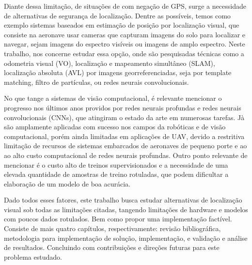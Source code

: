 Diante dessa limitação, de situações de com negação de GPS, surge a necessidade de alternativas de segurança de localização. Dentre as possíveis, temos como exemplo sistemas baseados em estimação de posição por localização visual, que consiste na aeronave usar cameras que capturam imagens do solo para localizar e navegar, sejam imagens do espectro visíveis ou imagens de amplo espectro. Neste trabalho, nos concerne estudar essa opção, onde são pesquisadas técnicas como a odometria visual (VO), localização e mapeamento simultâneo (SLAM), localização absoluta (AVL) por imagens georreferenciadas, seja por template matching, filtro de partículas, ou redes neurais convolucionais.

No que tange a sistemas de visão computacional, é relevante mencionar o progresso nos últimos anos providos por redes neurais profundas e redes neurais convolucionais (CNNs), que atingiram o estado da arte em numerosas tarefas. Jà são amplamente aplicadas com sucesso nos campos da robóticas e de visão computacional, porém ainda limitadas em aplicações de UAV, devido a restritiva limitação de recursos de sistemas embarcados de aeronaves de pequeno porte e ao ao alto custo computacional de redes neurais profundas. Outro ponto relevante de mencionar é o custo alto de treinos supervisionados e a necessidade de uma elevada quantidade de amostras de treino rotuladas, que podem dificultar a elaboração de um modelo de boa acurácia.

Dado todos esses fatores, este trabalho busca estudar alternativas de localização visual sob todas as limitações citadas, tangendo limitações de hardware e modelos com poucos dados rotulados. Bem como propor uma implementação factível. Consiste de mais quatro capítulos, respectivamente: revisão bibliográfica, metodologia para implementação de solução, implementação, e validação e análise de resultados. Concluindo com contribuições e direções futuras para este problema estudado.
